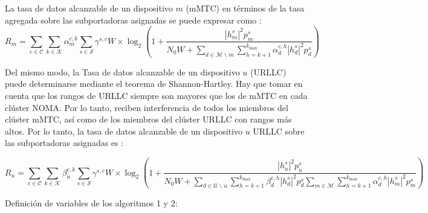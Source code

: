 La tasa de datos alcanzable de un dispositivo $m$ (mMTC) en términos de la tasa agregada sobre las subportadoras asignadas se puede expresar como \parencite{Shahini2019}:
\begin{equation}
{R_{m}}=\sum \limits _{c \in \mathcal {C}} {\sum \limits _{k \in \mathcal {K}} {\alpha _{m}^{c,k}\sum \limits _{s \in \mathcal {S}} {{\gamma ^{s,c}}W} } } \times {\log _{2}}\left ({{1 + \frac {{{{\left |{ {h_{m}^{s}} }\right |}^{2}}p_{m}^{s}}}{{N_{0}W + \sum \limits _{d \in \mathcal {M}\backslash m} {\sum \limits _{h = k + 1}^{{k_{\max }}} {\alpha _{d}^{c,h}{{\left |{ {h_{d}^{s}} }\right |}^{2}}p_{d}^{s}} } }}} }\right)
\label{eqn:Rm}
\end{equation}

Del mismo modo, la Tasa de datos alcanzable de un dispositivo $u$ (URLLC) puede determinarse mediante el teorema de Shannon-Hartley. Hay que tomar en cuenta que los rangos de URLLC siempre son mayores que los de mMTC en cada clúster NOMA. Por lo tanto, reciben interferencia de todos los miembros del clúster mMTC, así como de los miembros del clúster URLLC con rangos más altos. 
Por lo tanto, la tasa de datos alcanzable de un dispositivo $u$ URLLC sobre las subportadoras asignadas es \parencite{Shahini2019}:

\begin{equation}
{R_{u}}=\sum \limits _{c \in \mathcal {C}} {\sum \limits _{k \in \mathcal {K}} {\beta _{u}^{c,k}\sum \limits _{s \in \mathcal {S}} {{\gamma ^{s,c}}W} } } \times {\log _{2}}\left ({{1 + \frac {{{{\left |{ {h_{u}^{s}} }\right |}^{2}}p_{u}^{s}}}{{N_{0}W + \sum \limits _{d \in \mathcal {U}\backslash u} {\sum \limits _{h = k + 1}^{{k_{\max }}} {\beta _{d}^{c,h}{{\left |{ {h_{d}^{s}} }\right |}^{2}}p_{d}^{s}}} \sum \limits _{m \in \mathcal {M}} {\sum \limits _{h = k + 1}^{{k_{\max }}} {\alpha _{d}^{c,h}{{\left |{ {h_{m}^{s}} }\right |}^{2}}p_{m}^{s}} } }}} }\right)
\label{eqn:Ru}
\end{equation}


Definición de variables de los algoritmos 1 y 2:\newline

